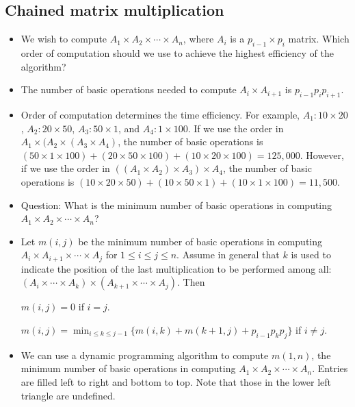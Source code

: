 \documentclass{article}
\begin{document}
\subsection{Chained matrix multiplication}


\begin{itemize}

\item We wish to compute $A_1\times A_2\times\cdots\times A_n$, where
$A_i$ is a $p_{i-1}\times p_i$ matrix. Which order of computation should
we use to achieve the highest efficiency of the algorithm?

\item The number of basic operations needed to compute $A_i\times A_{i+1}$ is 
$p_{i-1}p_ip_{i+1}$. 

\item Order of computation determines the time efficiency. For example,
$A_1: 10\times 20$, $A_2: 20\times 50$, $A_3: 50\times 1$, and
$A_4: 1\times 100$. If we use the order in 
$A_1\times(A_2\times(A_3\times A_4)$, the number of basic operations
is $(50\times1\times100)+(20\times50\times100)+(10\times20\times100)
=125,000$. However, if we use the order in 
$((A_1\times A_2)\times A_3)\times A_4$, the number of basic operations
is $(10\times20\times50)+(10\times50\times1)+(10\times1\times100)
=11,500$.

\item Question: What is the minimum number of basic operations
in computing $A_1\times A_2\times\cdots\times A_n$?

\item Let $m(i,j)$ be the minimum number of basic operations in
computing $A_i\times A_{i+1}\times\cdots\times A_j$ for
$1\le i\le j\le n$. Assume in general that $k$ is used to
indicate the position of the last multiplication to be 
performed among all: $(A_i\times\cdots\times A_k)\times
(A_{k+1}\times\cdots\times A_j)$. Then

$m(i,j)=0$ if $i=j$.

$m(i,j)=\min_{i\le k\le j-1}\{m(i,k)+m(k+1,j)+p_{i-1}p_kp_j\}$ if $i\not=j$.

\item We can use a dynamic programming algorithm to compute $m(1,n)$,
the minimum number of basic operations in computing 
$A_1\times A_2\times\cdots\times A_n$. Entries are filled left to right
and bottom to top. Note that those in the lower left triangle are
undefined.


\end{itemize}
\end{document}
